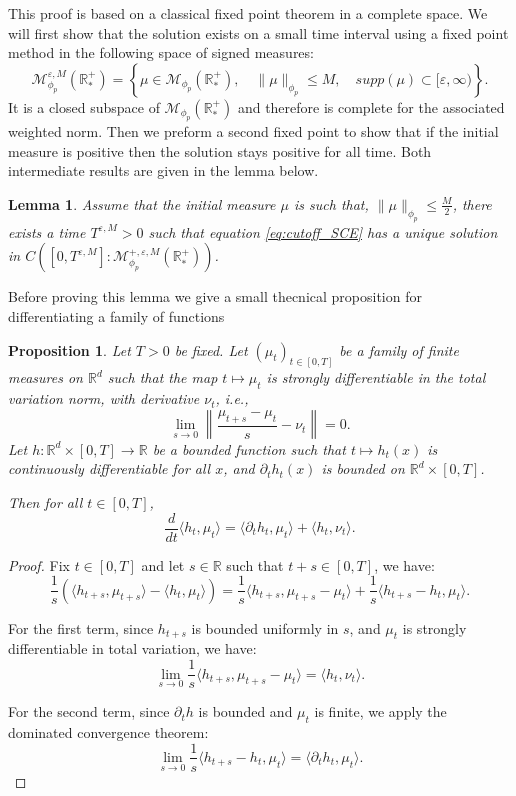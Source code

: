 \documentclass[11pt,a4paper]{article}
\newcommand{\RRP}{\mathbb{R}^+_*}
\newcommand{\MC}{\mathcal{M}}
\newtheorem{lemma}[theorem]{Lemma}
\newtheorem{proposition}[theorem]{Proposition}
\begin{document}
This proof is based on a classical fixed point theorem in a complete space. We will first show that the solution exists on a small time interval using a fixed point method in the following space of signed measures:
    \[ \MC^{\varepsilon,M}_{\phi_p}(\RRP) = \left\lbrace \mu \in \MC_{\phi_p}(\RRP) ,\quad \|\mu \|_{\phi_p}\leq M,\quad supp(\mu) \subset [\varepsilon,\infty)\right\rbrace. \]
It is a closed subspace of $\MC_{\phi_p}(\RRP)$ and therefore is complete for the associated weighted norm. Then we preform a second fixed point to show that if the initial measure is positive then the solution stays positive for all time. Both intermediate results are given in the lemma below. 
\begin{lemma}\label{lem:fixed-point-1}
    Assume that the initial measure $\mu$ is such that, $\| \mu\|_{\phi_p} \leq \frac{M}{2}$, there exists a time $T^{\varepsilon,M} > 0$ such that equation \eqref{eq:cutoff_SCE} has a unique solution in $C\left([0,T^{\varepsilon,M}]:\MC^{+,\varepsilon,M}_{\phi_p}(\RRP)\right)$. 
\end{lemma}
Before proving this lemma we give a small thecnical proposition for differentiating a family of functions
\begin{proposition}
    Let $T > 0$ be fixed. Let $\left(\mu_t \right)_{t \in [0,T]}$ be a family of finite measures on $\mathbb{R}^d$ such that the map $t \mapsto \mu_t$ is strongly differentiable in the total variation norm, with derivative $\nu_t$, i.e.,
    \[
    \lim_{s \to 0} \left\| \frac{\mu_{t+s} - \mu_t}{s} - \nu_t \right\| = 0.
    \]
    Let $h : \mathbb{R}^d \times [0,T] \to \mathbb{R}$ be a bounded function such that $t \mapsto h_t(x)$ is continuously differentiable for all $x$, and $\partial_t h_t(x)$ is bounded on $\mathbb{R}^d \times [0,T]$.
    
    Then for all $t \in [0,T]$,
    \[
    \frac{d}{dt} \langle h_t, \mu_t \rangle = \langle \partial_t h_t, \mu_t \rangle + \langle h_t, \nu_t \rangle.
    \]
    \end{proposition}
    
    \begin{proof}
    Fix $t \in [0,T]$ and let $s \in \mathbb{R}$ such that $t + s \in [0,T]$, we have:
    \[
    \frac{1}{s} \left( \langle h_{t+s}, \mu_{t+s} \rangle - \langle h_t, \mu_t \rangle \right) = \frac{1}{s} \langle h_{t+s}, \mu_{t+s} - \mu_t \rangle + \frac{1}{s} \langle h_{t+s} - h_t, \mu_t \rangle.
    \]
    
    For the first term, since $h_{t+s}$ is bounded uniformly in $s$, and $\mu_t$ is strongly differentiable in total variation, we have:
    \[
    \lim_{s \to 0} \frac{1}{s} \langle h_{t+s}, \mu_{t+s} - \mu_t \rangle = \langle h_t, \nu_t \rangle.
    \]
    
    For the second term, since $\partial_t h$ is bounded and $\mu_t$ is finite, we apply the dominated convergence theorem:
    \[
    \lim_{s \to 0} \frac{1}{s} \langle h_{t+s} - h_t, \mu_t \rangle = \langle \partial_t h_t, \mu_t \rangle.
    \]
    \end{proof}
    
\end{document}
